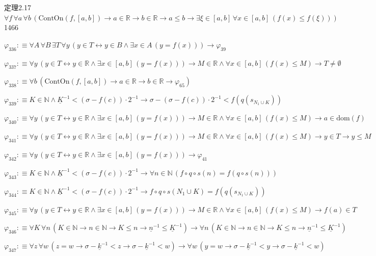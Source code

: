 \begin{fullproof}{定理2.17}{$\forall f\,\forall a\,\forall b\,(\mathrm{ContOn}(f,[a,b]) \to a \in \mathbb{R} \to b \in \mathbb{R} \to a \leq b \to \exists \xi \in [a,b]\,\forall x \in [a,b]\,(f(x) \leq f(\xi)))$}{1466}
\begin{abbrevlist}
\item $\varphi_{336} :\equiv \forall A\,\forall B\,\exists T\,\forall y\,(y \in T \leftrightarrow y \in B \land \exists x \in A\,(y = f(x))) \to \varphi_{39}$
\item $\varphi_{337} :\equiv \forall y\,(y \in T \leftrightarrow y \in \mathbb{R} \land \exists x \in [a,b]\,(y = f(x))) \to M \in \mathbb{R} \land \forall x \in [a,b]\,(f(x) \leq M) \to T \neq \emptyset$
\item $\varphi_{338} :\equiv \forall b\,(\mathrm{ContOn}(f,[a,b]) \to a \in \mathbb{R} \to b \in \mathbb{R} \to \varphi_{65})$
\item $\varphi_{339} :\equiv K \in \mathbb{N} \land \underline{K}^{-1} < (\sigma - f(c)) \cdot 2^{-1} \to \sigma - (\sigma - f(c)) \cdot 2^{-1} < f(q(s_{N_{1} \cup K}))$
\item $\varphi_{340} :\equiv \forall y\,(y \in T \leftrightarrow y \in \mathbb{R} \land \exists x \in [a,b]\,(y = f(x))) \to M \in \mathbb{R} \land \forall x \in [a,b]\,(f(x) \leq M) \to a \in \mathrm{dom}(f)$
\item $\varphi_{341} :\equiv \forall y\,(y \in T \leftrightarrow y \in \mathbb{R} \land \exists x \in [a,b]\,(y = f(x))) \to M \in \mathbb{R} \land \forall x \in [a,b]\,(f(x) \leq M) \to y \in T \to y \leq M$
\item $\varphi_{342} :\equiv \forall y\,(y \in T \leftrightarrow y \in \mathbb{R} \land \exists x \in [a,b]\,(y = f(x))) \to \varphi_{41}$
\item $\varphi_{343} :\equiv K \in \mathbb{N} \land \underline{K}^{-1} < (\sigma - f(c)) \cdot 2^{-1} \to \forall n \in \mathbb{N}\,(f \circ q \circ s(n) = f(q \circ s(n)))$
\item $\varphi_{344} :\equiv K \in \mathbb{N} \land \underline{K}^{-1} < (\sigma - f(c)) \cdot 2^{-1} \to f \circ q \circ s(N_{1} \cup K) = f(q(s_{N_{1} \cup K}))$
\item $\varphi_{345} :\equiv \forall y\,(y \in T \leftrightarrow y \in \mathbb{R} \land \exists x \in [a,b]\,(y = f(x))) \to M \in \mathbb{R} \land \forall x \in [a,b]\,(f(x) \leq M) \to f(a) \in T$
\item $\varphi_{346} :\equiv \forall K\,\forall n\,(K \in \mathbb{N} \to n \in \mathbb{N} \to K \leq n \to \underline{n}^{-1} \leq \underline{K}^{-1}) \to \forall n\,(K \in \mathbb{N} \to n \in \mathbb{N} \to K \leq n \to \underline{n}^{-1} \leq \underline{K}^{-1})$
\item $\varphi_{347} :\equiv \forall z\,\forall w\,(z = w \to \sigma - \underline{k}^{-1} < z \to \sigma - \underline{k}^{-1} < w) \to \forall w\,(y = w \to \sigma - \underline{k}^{-1} < y \to \sigma - \underline{k}^{-1} < w)$

\end{abbrevlist}
\end{fullproof}
